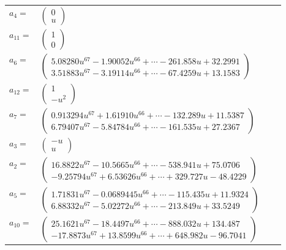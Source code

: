 \documentclass[1p]{elsarticle_modified}
\theoremstyle{definition}
\begin{document}
\begin{tabular}{m{7pt} m{180pt} m{7pt} m{180pt} }
\flushright $a_{4}=$&$\begin{pmatrix}0\\u\end{pmatrix}$ \\
\flushright $a_{11}=$&$\begin{pmatrix}1\\0\end{pmatrix}$ \\
\flushright $a_{6}=$&$\begin{pmatrix}5.08280 u^{67}-1.90052 u^{66}+\cdots-261.858 u+32.2991\\3.51883 u^{67}-3.19114 u^{66}+\cdots-67.4259 u+13.1583\end{pmatrix}$ \\
\flushright $a_{12}=$&$\begin{pmatrix}1\\- u^2\end{pmatrix}$ \\
\flushright $a_{7}=$&$\begin{pmatrix}0.913294 u^{67}+1.61910 u^{66}+\cdots-132.289 u+11.5387\\6.79407 u^{67}-5.84784 u^{66}+\cdots-161.535 u+27.2367\end{pmatrix}$ \\
\flushright $a_{3}=$&$\begin{pmatrix}- u\\u\end{pmatrix}$ \\
\flushright $a_{2}=$&$\begin{pmatrix}16.8822 u^{67}-10.5665 u^{66}+\cdots-538.941 u+75.0706\\-9.25794 u^{67}+6.53626 u^{66}+\cdots+329.727 u-48.4229\end{pmatrix}$ \\
\flushright $a_{5}=$&$\begin{pmatrix}1.71831 u^{67}-0.0689445 u^{66}+\cdots-115.435 u+11.9324\\6.88332 u^{67}-5.02272 u^{66}+\cdots-213.849 u+33.5249\end{pmatrix}$ \\
\flushright $a_{10}=$&$\begin{pmatrix}25.1621 u^{67}-18.4497 u^{66}+\cdots-888.032 u+134.487\\-17.8873 u^{67}+13.8599 u^{66}+\cdots+648.982 u-96.7041\end{pmatrix}$ \\

\end{tabular}
\end{document}
